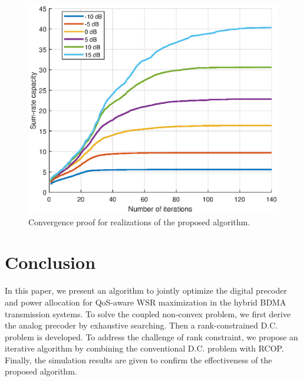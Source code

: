 \documentclass[10pt,journal,twocolumn,twoside]{IEEEtran}
\begin{document}
\begin{figure}[ht]
	\begin{center}
		\includegraphics[scale=0.66]{Figure/convergence.eps}
		\caption{Convergence proof for realizations of the proposed algorithm.}\label{fig:convergence}
	\end{center}
\end{figure}

%
%
%

\section{Conclusion}
In this paper, we present an algorithm to jointly optimize the digital precoder and power allocation for QoS-aware WSR maximization in the hybrid BDMA transmission systems. To solve the coupled non-convex problem, we first derive the analog precoder by exhaustive searching. Then a rank-constrained D.C. problem is developed. To address the challenge of rank constraint, we propose an iterative algorithm by combining the conventional D.C. problem with RCOP. Finally, the simulation results are given to confirm the effectiveness of the proposed algorithm.





\end{document}
